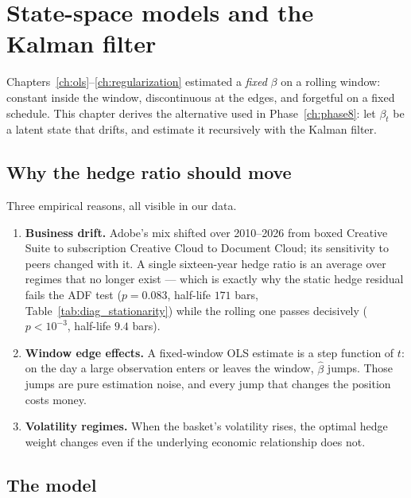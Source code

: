 \section{State-space models and the Kalman filter}
\label{ch:kalman}

Chapters~\ref{ch:ols}--\ref{ch:regularization} estimated a \emph{fixed} $\beta$ on a
rolling window: constant inside the window, discontinuous at the edges, and forgetful on
a fixed schedule. This chapter derives the alternative used in Phase~\ref{ch:phase8}: let
$\beta_t$ be a latent state that drifts, and estimate it recursively with the Kalman
filter.

\subsection{Why the hedge ratio should move}
\label{sec:kalman:why}

Three empirical reasons, all visible in our data.
\begin{enumerate}
  \item \textbf{Business drift.} Adobe's mix shifted over 2010--2026 from boxed Creative
    Suite to subscription Creative Cloud to Document Cloud; its sensitivity to peers
    changed with it. A single sixteen-year hedge ratio is an average over regimes that no
    longer exist --- which is exactly why the static hedge residual fails the ADF test
    ($p=0.083$, half-life $171$ bars, Table~\ref{tab:diag_stationarity}) while the
    rolling one passes decisively ($p<10^{-3}$, half-life $9.4$ bars).
  \item \textbf{Window edge effects.} A fixed-window OLS estimate is a step function of
    $t$: on the day a large observation enters or leaves the window, $\hat\beta$ jumps.
    Those jumps are pure estimation noise, and every jump that changes the position
    costs money.
  \item \textbf{Volatility regimes.} When the basket's volatility rises, the optimal
    hedge weight changes even if the underlying economic relationship does not.
\end{enumerate}

\subsection{The model}
\label{sec:kalman:model}

